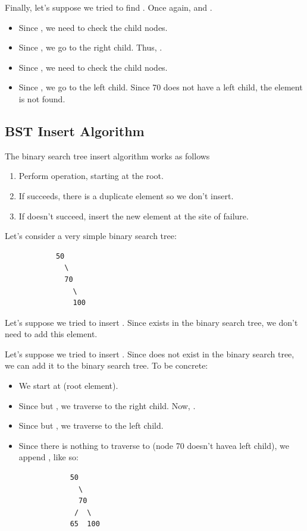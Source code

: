 \documentclass[letterpaper]{article}
\begin{document}
Finally, let's suppose we tried to find . Once again,  and . 
\begin{itemize}
    \item Since , we need to check the child nodes. 
    \item Since , we go to the right child. Thus, .
    \item Since , we need to check the child nodes.
    \item Since , we go to the left child. Since 70 does not have a left child, the element is not found. 
\end{itemize}

\subsection{BST Insert Algorithm}
The binary search tree insert algorithm works as follows
\begin{enumerate}
    \item Perform  operation, starting at the root. 
    \item If  succeeds, there is a duplicate element so we don't insert. 
    \item If  doesn't succeed, insert the new element at the site of failure. 
\end{enumerate}

Let's consider a very simple binary search tree: 
\begin{verbatim}
            50 
              \ 
              70 
                \ 
                100 
\end{verbatim}

Let's suppose we tried to insert . Since  exists in the binary search tree, we don't need to add this element. 

\bigskip 

Let's suppose we tried to insert . Since  does not exist in the binary search tree, we can add it to the binary search tree. To be concrete: 
\begin{itemize}
    \item We start at \code{50} (root element). 
    \item Since  but , we traverse to the right child. Now, . 
    \item Since \code{current != 65} but , we traverse to the left child.
    \item Since there is nothing to traverse to (node 70 doesn't havea  left child), we append \code{65}, like so:
    \begin{verbatim}
            50 
              \ 
              70 
             /  \ 
            65  100 
    \end{verbatim}
\end{itemize}
\end{document}
